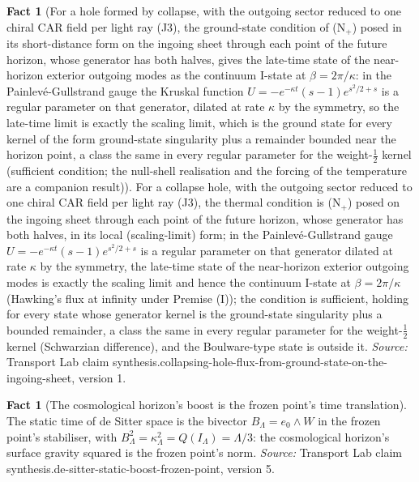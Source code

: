 \documentclass[11pt]{article}
\theoremstyle{definition}
\newtheorem{fact}[theorem]{Fact}
\theoremstyle{plain}
\begin{document}
\begin{fact}[For a hole formed by collapse, with the outgoing sector reduced to one chiral CAR field per light ray (J3), the ground-state condition of (N$_{+}$) posed in its short-distance form on the ingoing sheet through each point of the future horizon, whose generator has both halves, gives the late-time state of the near-horizon exterior outgoing modes as the continuum I-state at $\beta = 2\pi/\kappa$: in the Painlev\'e-Gullstrand gauge the Kruskal function $U = -e^{-\kappa t}(s-1)e^{s^{2}/2+s}$ is a regular parameter on that generator, dilated at rate $\kappa$ by the symmetry, so the late-time limit is exactly the scaling limit, which is the ground state for every kernel of the form ground-state singularity plus a remainder bounded near the horizon point, a class the same in every regular parameter for the weight-$\tfrac12$ kernel (sufficient condition; the null-shell realisation and the forcing of the temperature are a companion result)]\label{c:synthesis.collapsing-hole-flux-from-ground-state-on-the-ingoing-sheet}
For a collapse hole, with the outgoing sector reduced to one chiral CAR field per light ray (J3), the thermal condition is (N$_{+}$) posed on the ingoing sheet through each point of the future horizon, whose generator has both halves, in its local (scaling-limit) form; in the Painlev\'e-Gullstrand gauge $U = -e^{-\kappa t}(s-1)e^{s^{2}/2+s}$ is a regular parameter on that generator dilated at rate $\kappa$ by the symmetry, the late-time state of the near-horizon exterior outgoing modes is exactly the scaling limit and hence the continuum I-state at $\beta = 2\pi/\kappa$ (Hawking's flux at infinity under Premise (I)); the condition is sufficient, holding for every state whose generator kernel is the ground-state singularity plus a bounded remainder, a class the same in every regular parameter for the weight-$\tfrac12$ kernel (Schwarzian difference), and the Boulware-type state is outside it.
\emph{Source:} Transport Lab claim synthesis.collapsing-hole-flux-from-ground-state-on-the-ingoing-sheet, version 1.
\end{fact}

\begin{fact}[The cosmological horizon's boost is the frozen point's time translation]\label{c:synthesis.de-sitter-static-boost-frozen-point}
The static time of de Sitter space is the bivector $B_{\Lambda} = e_{0}\wedge W$ in the frozen point's stabiliser, with $B_{\Lambda}^{2} = \kappa_{\Lambda}^{2} = Q(I_{\Lambda}) = \Lambda/3$: the cosmological horizon's surface gravity squared is the frozen point's norm.
\emph{Source:} Transport Lab claim synthesis.de-sitter-static-boost-frozen-point, version 5.
\end{fact}
\end{document}
